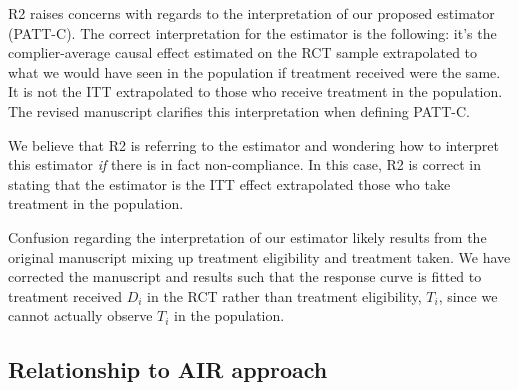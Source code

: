 \documentclass[hidelinks,12pt,letterpaper]{article}
\begin{document}

R2 raises concerns with regards to the interpretation of our proposed estimator (PATT-C). The correct interpretation for the estimator is the following: it's the complier-average causal effect estimated on the RCT sample extrapolated to what we would have seen in the population if treatment received were the same. It is not the ITT extrapolated to those who receive treatment in the population. The revised manuscript clarifies this interpretation when defining PATT-C. 

We believe that R2 is referring to the \citet{Hartman} estimator and wondering how to interpret this estimator \emph{if} there is in fact non-compliance. In this case, R2 is correct in stating that the \citet{Hartman} estimator is the ITT effect extrapolated those who take treatment in the population. 

Confusion regarding the interpretation of our estimator likely results from the original manuscript mixing up treatment eligibility and treatment taken. We have corrected the manuscript and results such that the response curve is fitted to treatment received $D_i$ in the RCT rather than treatment eligibility, $T_i$, since we cannot actually observe $T_i$ in the population. 

\subsection{Relationship to AIR approach}\label{reweighting}
\end{document}
